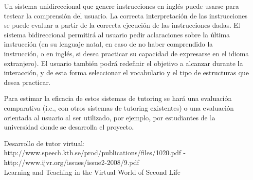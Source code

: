 Un sistema unidireccional que genere instrucciones en ingl\'es puede
usarse para testear la comprensi\'on del usuario.  La correcta
interpretaci\'on de las instrucciones se puede evaluar a partir de la
correcta ejecuci\'on de las instrucciones dadas.  El sistema
bidireccional permitir\'a al usuario pedir aclaraciones sobre la
\'ultima instrucci\'on (en su lenguaje natal, en caso de no haber comprendido
la instrucci\'on, o en ingl\'es, si desea practicar su
capacidad de expresarse en el idioma extranjero).  El usuario tambi\'en
podr\'a redefinir el objetivo a alcanzar durante la interacci\'on, y
de esta forma seleccionar el vocabulario y el tipo de estructuras que desea
practicar.

Para estimar la eficacia de estos sistemas de tutoring se har\'a una
evaluaci\'on comparativa (i.e., con otros
sistemas de tutoring existentes) o una evaluaci\'on orientada al usuario al ser
utilizado, por ejemplo, por estudiantes de la universidad donde se desarrolla el
proyecto.

Desarrollo de tutor virtual: 
http://www.speech.kth.se/prod/publications/files/1020.pdf - \\
http://www.ijvr.org/issues/issue2-2008/9.pdf \\
Learning and Teaching in the Virtual World of Second Life\\

\citep{Eskenazi09, Wik09, Doswell05}











